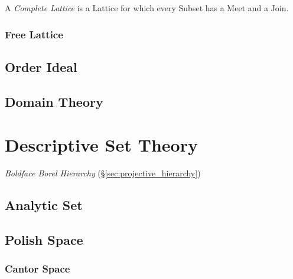 A \emph{Complete Lattice} is a Lattice for which every Subset has a
Meet and a Join.



\subsubsection{Free Lattice}



\subsection{Order Ideal}\label{sec:order_ideal}



\subsection{Domain Theory}\label{sec:domain_theory}



\section{Descriptive Set Theory}

\emph{Boldface Borel Hierarchy} (\S\ref{sec:projective_hierarchy})

\subsection{Analytic Set}\label{sec:analytic_set}

\subsection{Polish Space}\label{sec:polish_space}

\subsubsection{Cantor Space}

